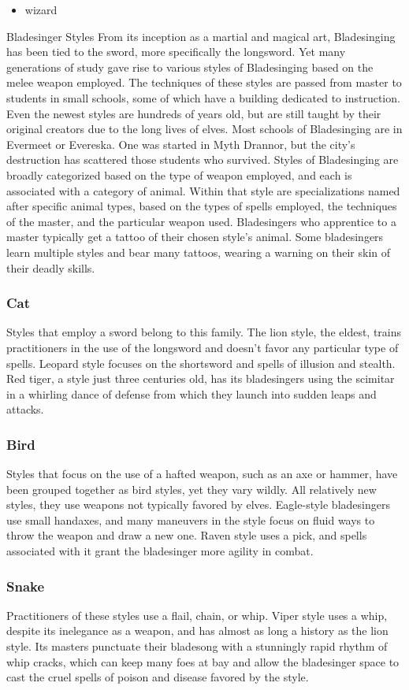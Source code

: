 \documentclass[10pt,a4paper,twoside,twocolumn,openany,bg=print,nodeprecatedcode]{dndbook}
\begin{document}
\begin{itemize}
\item wizard
\end{itemize}

\begin{DndComment}{Bladesinger Styles}
From its inception as a martial and magical art, Bladesinging has been tied to the sword, more specifically the longsword. Yet many generations of study gave rise to various styles of Bladesinging based on the melee weapon employed. The techniques of these styles are passed from master to students in small schools, some of which have a building dedicated to instruction. Even the newest styles are hundreds of years old, but are still taught by their original creators due to the long lives of elves. Most schools of Bladesinging are in Evermeet or Evereska. One was started in Myth Drannor, but the city's destruction has scattered those students who survived.
Styles of Bladesinging are broadly categorized based on the type of weapon employed, and each is associated with a category of animal. Within that style are specializations named after specific animal types, based on the types of spells employed, the techniques of the master, and the particular weapon used. Bladesingers who apprentice to a master typically get a tattoo of their chosen style's animal. Some bladesingers learn multiple styles and bear many tattoos, wearing a warning on their skin of their deadly skills.
\subsubsection{Cat}
Styles that employ a sword belong to this family. The lion style, the eldest, trains practitioners in the use of the longsword and doesn't favor any particular type of spells. Leopard style focuses on the shortsword and spells of illusion and stealth. Red tiger, a style just three centuries old, has its bladesingers using the scimitar in a whirling dance of defense from which they launch into sudden leaps and attacks.
\subsubsection{Bird}
Styles that focus on the use of a hafted weapon, such as an axe or hammer, have been grouped together as bird styles, yet they vary wildly. All relatively new styles, they use weapons not typically favored by elves. Eagle-style bladesingers use small handaxes, and many maneuvers in the style focus on fluid ways to throw the weapon and draw a new one. Raven style uses a pick, and spells associated with it grant the bladesinger more agility in combat.
\subsubsection{Snake}
Practitioners of these styles use a flail, chain, or whip. Viper style uses a whip, despite its inelegance as a weapon, and has almost as long a history as the lion style. Its masters punctuate their bladesong with a stunningly rapid rhythm of whip cracks, which can keep many foes at bay and allow the bladesinger space to cast the cruel spells of poison and disease favored by the style.
\end{DndComment}
\end{document}
